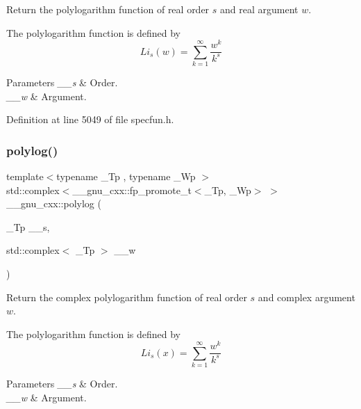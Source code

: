 Return the polylogarithm function of real order $ s $ and real argument $ w $.

The polylogarithm function is defined by \[ Li_s(w) = \sum_{k=1}^{\infty} \frac{w^k}{k^s} \]


\begin{DoxyParams}{Parameters}
{\em \+\_\+\+\_\+s} & Order. \\
\hline
{\em \+\_\+\+\_\+w} & Argument. \\
\hline
\end{DoxyParams}


Definition at line 5049 of file specfun.\+h.

\mbox{\label{group__gnu__math__spec__func_ga817a208972a0200b667c68d199176d70}} 
\subsubsection{\texorpdfstring{polylog()}{polylog()}\hspace{0.1cm}{\footnotesize\ttfamily [2/2]}}
{\footnotesize\ttfamily template$<$typename \+\_\+\+Tp , typename \+\_\+\+Wp $>$ \\
std\+::complex$<$\+\_\+\+\_\+gnu\+\_\+cxx\+::fp\+\_\+promote\+\_\+t$<$\+\_\+\+Tp, \+\_\+\+Wp$>$ $>$ \+\_\+\+\_\+gnu\+\_\+cxx\+::polylog (\begin{DoxyParamCaption}\item[{\+\_\+\+Tp}]{\+\_\+\+\_\+s,  }\item[{std\+::complex$<$ \+\_\+\+Tp $>$}]{\+\_\+\+\_\+w }\end{DoxyParamCaption})\hspace{0.3cm}{\ttfamily [inline]}}

Return the complex polylogarithm function of real order $ s $ and complex argument $ w $.

The polylogarithm function is defined by \[ Li_s(x) = \sum_{k=1}^{\infty} \frac{w^k}{k^s} \]


\begin{DoxyParams}{Parameters}
{\em \+\_\+\+\_\+s} & Order. \\
\hline
{\em \+\_\+\+\_\+w} & Argument. \\
\hline
\end{DoxyParams}


